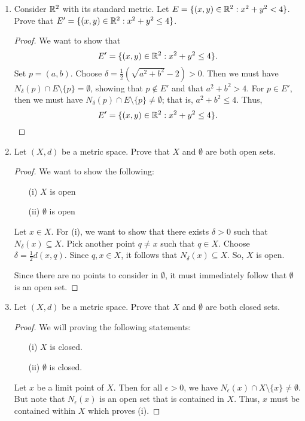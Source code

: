\documentclass[a4paper]{article}
\begin{document}
\begin{enumerate}
\begin{enumerate}
\begin{solution}
                \end{solution}
        \end{enumerate}
    \item Consider \( \mathbb{R}^{2}  \) with its standard metric. Let \( E = \{ (x,y) \in \mathbb{R}^{2} : x^{2} + y^{2} < 4  \}  \). Prove that \( E' = \{ (x,y) \in \mathbb{R}^{2} : x^{2} + y^{2} \leq 4  \}  \).
        \begin{proof}
        We want to show that 
        \[  E' = \{ (x,y) \in \mathbb{R}^{2} : x^{2} + y^{2} \leq 4 \}. \]
         Set \( p = (a,b) \). Choose \( \delta = \frac{ 1 }{ 2 }  (\sqrt{ a^{2} + b^{2} } - 2 ) > 0 \). Then we must have \( {N}_{\delta}(p) \cap E \setminus  \{ p \} = \emptyset \), showing that \( p \notin E' \) and that \( a^{2} + b^{2} > 4  \). For \( p \in E' \), then we must have \( {N}_{\delta}(p) \cap E \setminus  \{ p  \} \neq \emptyset \); that is, \( a^{2} + b^{2} \leq 4 \). Thus, 
         \[  E' = \{ (x,y) \in \mathbb{R}^{2} : x^{2} + y^{2} \leq 4 \}. \]
        \end{proof}
    \item Let \( (X,d)  \) be a metric space. Prove that \( X  \) and \( \emptyset  \) are both open sets.
        \begin{proof}
        We want to show the following: 
        \begin{enumerate}
            \item[(i)] \( X  \) is open 
            \item[(ii)] \( \emptyset \) is open
        \end{enumerate}
        Let \( x \in X \). For (i), we want to show that there exists \( \delta > 0 \) such that \( {N}_{\delta}(x) \subseteq X  \). Pick another point \( q \neq x  \) such that \( q \in X  \). Choose \( \delta = \frac{ 1 }{ 2 } d(x,q) \). Since \( q,x \in X  \), it follows that \( {N}_{\delta}(x) \subseteq X  \). So, \( X  \) is open. 

        Since there are no points to consider in \( \emptyset \), it must immediately follow that \( \emptyset  \) is an open set.
        \end{proof}
    \item Let \( (X,d)  \) be a metric space. Prove that \( X  \) and \( \emptyset  \) are both closed sets.
        \begin{proof}
        We will proving the following statements: 
        \begin{enumerate}
            \item[(i)] \( X  \) is closed.
            \item[(ii)] \( \emptyset \) is closed.
        \end{enumerate}
        Let \( x  \) be a limit point of \( X  \). Then for all \( \epsilon > 0 \), we have \( {N}_{\epsilon}(x) \cap X \setminus  \{ x \} \neq \emptyset  \). But note that \( {N}_{\epsilon}(x) \) is an open set that is contained in \( X  \). Thus, \( x  \) must be contained within \( X  \) which proves (i).


\end{proof}
\end{enumerate}
\end{document}
